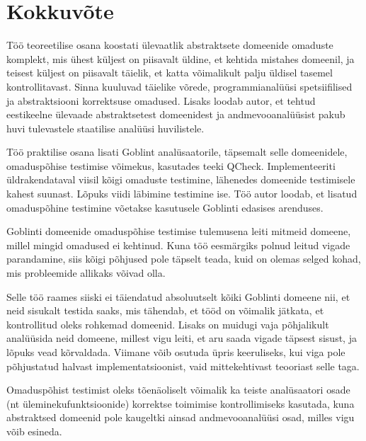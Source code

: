 \documentclass[../thesis.tex]{subfiles}
\begin{document}
\section{Kokkuvõte}

Töö teoreetilise osana koostati ülevaatlik abstraktsete domeenide omaduste komplekt, mis ühest küljest on piisavalt üldine, et kehtida mistahes domeenil, ja teisest küljest on piisavalt täielik, et katta võimalikult palju üldisel tasemel kontrollitavast. Sinna kuuluvad täielike võrede, programmianalüüsi spetsiifilised ja abstraktsiooni korrektsuse omadused. Lisaks loodab autor, et tehtud eestikeelne ülevaade abstraktsetest domeenidest ja andmevooanalüüsist pakub huvi tulevastele staatilise analüüsi huvilistele.

Töö praktilise osana lisati Goblint analüsaatorile, täpsemalt selle domeenidele, omaduspõhise testimise võimekus, kasutades teeki QCheck. Implementeeriti üldrakendataval viisil kõigi omaduste testimine, lähenedes domeenide testimisele kahest suunast. Lõpuks viidi läbimine testimine ise. Töö autor loodab, et lisatud omaduspõhine testimine võetakse kasutusele Goblinti edasises arenduses.

Goblinti domeenide omaduspõhise testimise tulemusena leiti mitmeid domeene, millel mingid omadused ei kehtinud. Kuna töö eesmärgiks polnud leitud vigade parandamine, siis kõigi põhjused pole täpselt teada, kuid on olemas selged kohad, mis probleemide allikaks võivad olla.

Selle töö raames siiski ei täiendatud absoluutselt kõiki Goblinti domeene nii, et neid sisukalt testida saaks, mis tähendab, et tööd on võimalik jätkata, et kontrollitud oleks rohkemad domeenid. Lisaks on muidugi vaja põhjalikult analüüsida neid domeene, millest vigu leiti, et aru saada vigade täpsest sisust, ja lõpuks vead kõrvaldada. Viimane võib osutuda üpris keeruliseks, kui viga pole põhjustatud halvast implementatsioonist, vaid mittekehtivast teooriast selle taga.

Omaduspõhist testimist oleks tõenäoliselt võimalik ka teiste analüsaatori osade (nt üleminekufunktsioonide) korrektse toimimise kontrollimiseks kasutada, kuna abstraktsed domeenid pole kaugeltki ainsad andmevooanalüüsi osad, milles vigu võib esineda.

\end{document}
